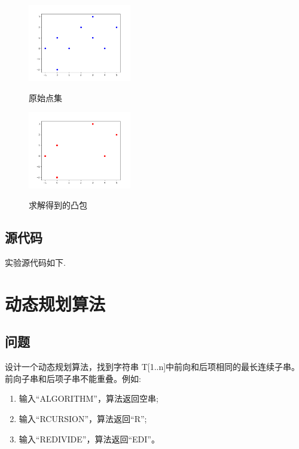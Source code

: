 \documentclass[UTF8]{ctexart}
\begin{document}
	\begin{figure}[H]
	  \centering
	  \label{fig:Per6A}\includegraphics[width=0.4\textwidth]{original.png}\
	  \caption{原始点集}
	  \label{fig:oscil}
	\end{figure}

  \begin{figure}[H]
    \centering
    \label{fig:Per6A}\includegraphics[width=0.4\textwidth]{convex.png}\
    \caption{求解得到的凸包}
    \label{fig:oscil}
  \end{figure}

\subsection{源代码}
实验源代码如下.  \vspace{5mm}
	
	\vspace{3mm}






\newpage
\section{动态规划算法}
\subsection{问题}
设计一个动态规划算法，找到字符串 T[1..n]中前向和后项相同的最长连续子串。前向子串和后项子串不能重叠。例如:
\begin{enumerate}
  \item 输入“ALGORITHM”，算法返回空串;
  \item 输入“RCURSION”，算法返回“R”;
  \item 输入“REDIVIDE”，算法返回“EDI”。
\end{enumerate}
\end{document}
